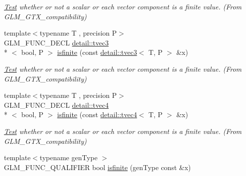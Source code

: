 \begin{DoxyCompactItemize}
\begin{DoxyCompactList}\small\item\em \hyperlink{class_test}{Test} whether or not a scalar or each vector component is a finite value. (From G\-L\-M\-\_\-\-G\-T\-X\-\_\-compatibility) \end{DoxyCompactList}\item 
\hypertarget{group__gtx__compatibility_ga416b6078bffd22e3a56a5c5379ba2cf8}{{\footnotesize template$<$typename T , precision P$>$ }\\G\-L\-M\-\_\-\-F\-U\-N\-C\-\_\-\-D\-E\-C\-L \hyperlink{structglm_1_1detail_1_1tvec3}{detail\-::tvec3}\\*
$<$ bool, P $>$ \hyperlink{group__gtx__compatibility_ga416b6078bffd22e3a56a5c5379ba2cf8}{isfinite} (const \hyperlink{structglm_1_1detail_1_1tvec3}{detail\-::tvec3}$<$ T, P $>$ \&x)}\label{group__gtx__compatibility_ga416b6078bffd22e3a56a5c5379ba2cf8}

\begin{DoxyCompactList}\small\item\em \hyperlink{class_test}{Test} whether or not a scalar or each vector component is a finite value. (From G\-L\-M\-\_\-\-G\-T\-X\-\_\-compatibility) \end{DoxyCompactList}\item 
\hypertarget{group__gtx__compatibility_gab256d4b6eaa066847d0629d6dde1dcba}{{\footnotesize template$<$typename T , precision P$>$ }\\G\-L\-M\-\_\-\-F\-U\-N\-C\-\_\-\-D\-E\-C\-L \hyperlink{structglm_1_1detail_1_1tvec4}{detail\-::tvec4}\\*
$<$ bool, P $>$ \hyperlink{group__gtx__compatibility_gab256d4b6eaa066847d0629d6dde1dcba}{isfinite} (const \hyperlink{structglm_1_1detail_1_1tvec4}{detail\-::tvec4}$<$ T, P $>$ \&x)}\label{group__gtx__compatibility_gab256d4b6eaa066847d0629d6dde1dcba}

\begin{DoxyCompactList}\small\item\em \hyperlink{class_test}{Test} whether or not a scalar or each vector component is a finite value. (From G\-L\-M\-\_\-\-G\-T\-X\-\_\-compatibility) \end{DoxyCompactList}\item 
\hypertarget{group__gtx__compatibility_gaf4b04dcd3526996d68c1bfe17bfc8657}{{\footnotesize template$<$typename gen\-Type $>$ }\\G\-L\-M\-\_\-\-F\-U\-N\-C\-\_\-\-Q\-U\-A\-L\-I\-F\-I\-E\-R bool \hyperlink{group__gtx__compatibility_gaf4b04dcd3526996d68c1bfe17bfc8657}{isfinite} (gen\-Type const \&x)}\label{group__gtx__compatibility_gaf4b04dcd3526996d68c1bfe17bfc8657}


\end{DoxyCompactItemize}
